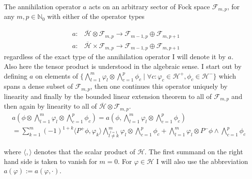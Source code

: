 \documentclass[b5paper,draft,openbib,12pt]{memoir}
\begin{document}
The
annihilation operator \(a\) acts on an arbitrary sector of Fock space
\(\mathcal{F}_{m,p}\), for any \(m,p\in\mathbb{N}_0\) with either of the operator types


\begin{align}
a: &\overline{\mathcal{H}}\otimes \mathcal{F}_{m,p} \rightarrow \mathcal{F}_{m-1,p}\oplus \mathcal{F}_{m,p+1}\\
a: &\overline{\mathcal{H}}\times \mathcal{F}_{m,p} \rightarrow \mathcal{F}_{m-1,p}\oplus \mathcal{F}_{m,p+1}
\end{align}
regardless of the exact type of the annihilation operator I will denote it by \(a\). Also here the tensor product is 
understood in the algebraic sense.
I start out by defining \(a\) on elements of 
\(\{\bigwedge_{l=1}^m \varphi_l \otimes \bigwedge_{c=1}^p \phi_c  \mid \forall c:  \varphi_c \in \mathcal{H}^+, \phi_c \in \mathcal{H}^-   \}\)
which spans a dense subset of \(\mathcal{F}_{m,p}\), then one continues this operator uniquely by 
linearity and finally by the bounded linear extension theorem to all of \(\mathcal{F}_{m,p}\) and then 
again by linearity to all of \(\overline{\mathcal{H}}\otimes \mathcal{F}_{m,p}\).
\begin{align}
&a\left(\phi \otimes \bigwedge_{l=1}^m \varphi_l \otimes \bigwedge_{c=1}^p \phi_c\right)=a\left(\phi,\bigwedge_{l=1}^m \varphi_l \otimes \bigwedge_{c=1}^p \phi_c\right)\\
&= \sum_{k=1}^m (-1)^{1+k} \langle P^+ \phi, \varphi_k\rangle \bigwedge_{\overset{l=1}{l\neq k}}^m \varphi_l \otimes \bigwedge_{c=1}^p \phi_c + \bigwedge_{l=1}^m \varphi_l \otimes P^- \phi \wedge \bigwedge_{c=1}^p \phi_c
\end{align}


where \(\langle, \rangle\) denotes that the scalar product of \(\mathcal{H}\). The first summand on the right hand side is taken to vanish for \(m=0\). 
For \(\varphi\in \mathcal{H}\) I will also use the abbreviation \(a(\varphi):=a(\varphi,\cdot)\).
\end{document}

